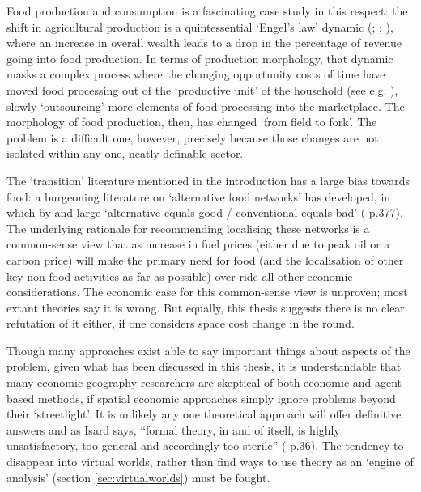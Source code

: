 Food production and consumption is a fascinating case study in this respect: the shift in agricultural production is a quintessential `Engel's law' dynamic (\citealt{zimmerman_ernst_1932}; \citealt{murata_rural-urban_2002}; \citealt{murata_engels_2008}), where an increase in overall wealth leads to a drop in the percentage of revenue going into food production. In terms of production morphology, that dynamic masks a complex process where the changing opportunity costs of time have moved food processing out of the `productive unit' of the household (see e.g. \citealt{taylor_agricultural_2003}), slowly `outsourcing' more elements of food processing into the marketplace. The morphology of food production, then, has changed `from field to fork'. The problem is a difficult one, however, precisely because those changes are not isolated within any one, neatly definable sector.

The `transition' literature mentioned in the introduction has a large bias towards food: a burgeoning literature on `alternative food networks' has developed, in which by and large `alternative equals good / conventional equals bad' (\citealt{penker_mapping_2006} p.377). The underlying rationale for recommending localising these networks is a common-sense view that as increase in fuel prices (either due to peak oil or a carbon price) will make the primary need for food (and the localisation of other key non-food activities as far as possible) over-ride all other economic considerations. The economic case for this common-sense view is unproven; most extant theories say it is wrong. But equally, this thesis suggests there is no clear refutation of it either, if one considers space cost change in the round. 

Though many approaches exist able to say important things about aspects of the problem, given what has been discussed in this thesis, it is understandable that many economic geography researchers are skeptical of both economic and agent-based methods, if spatial economic approaches simply ignore problems beyond their `streetlight'. It is unlikely any one theoretical approach will offer definitive answers and as Isard says, ``formal theory, in and of itself, is highly unsatisfactory, too general and accordingly too sterile'' (\citealt{isard_location_1956} p.36). The tendency to disappear into virtual worlds, rather than find ways to use theory as an `engine of analysis' (section \ref{sec:virtualworlds}) must be fought. 

